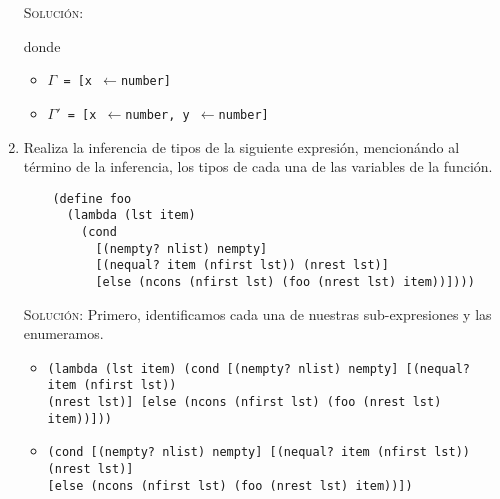 \documentclass[letterpaper,11pt]{article}
\begin{document}
\begin{enumerate}
    \textsc{Solución:} 
    \begin{prooftree}
    \end{prooftree}

    donde 
    \begin{itemize}
        \item \texttt{$\Gamma$ = [x $\leftarrow$number]}
        \item \texttt{$\Gamma'$ = [x $\leftarrow$number, 
        y $\leftarrow$number]}
    \end{itemize}

    \item Realiza la inferencia de tipos de la siguiente expresión, mencionándo
    al término de la inferencia, los tipos de cada una de las variables de la 
    función.
    \begin{verbatim}
    (define foo 
      (lambda (lst item)
        (cond 
          [(nempty? nlist) nempty]
          [(nequal? item (nfirst lst)) (nrest lst)]
          [else (ncons (nfirst lst) (foo (nrest lst) item))])))
    \end{verbatim}

    \textsc{Solución:} Primero, identificamos cada una de nuestras 
    sub-expresiones y las enumeramos.
    \begin{itemize}
        \item {} \texttt{(lambda (lst item) (cond [(nempty? nlist) nempty]
        [(nequal? item (nfirst lst))} \\ 
        \texttt{(nrest lst)] [else (ncons (nfirst lst) (foo (nrest lst) item))]))}

        \item {} \texttt{(cond [(nempty? nlist) nempty] [(nequal? item 
        (nfirst lst)) (nrest lst)]} \\ 
        \texttt{[else (ncons (nfirst lst) (foo (nrest lst) item))])}


\end{itemize}
\end{enumerate}
\end{document}
